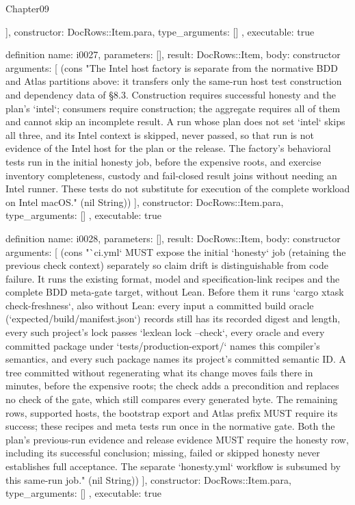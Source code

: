 \begin{lexlean}{Chapter09}
\begin{semanticmodule}
{{    ],
    constructor: DocRows::Item.para,
    type_arguments: []
  },
  executable: true
}

definition{
  name: i0027,
  parameters: [],
  result: DocRows::Item,
  body: constructor{
    arguments: [
      (cons "The Intel host factory is separate from the normative BDD and Atlas partitions above: it transfers only the same-run host test construction and dependency data of §8.3. Construction requires successful honesty and the plan's `intel`; consumers require construction; the aggregate requires all of them and cannot skip an incomplete result. A run whose plan does not set `intel` skips all three, and its Intel context is skipped, never passed, so that run is not evidence of the Intel host for the plan or the release. The factory's behavioral tests run in the initial honesty job, before the expensive roots, and exercise inventory completeness, custody and fail-closed result joins without needing an Intel runner. These tests do not substitute for execution of the complete workload on Intel macOS." (nil String))
    ],
    constructor: DocRows::Item.para,
    type_arguments: []
  },
  executable: true
}

definition{
  name: i0028,
  parameters: [],
  result: DocRows::Item,
  body: constructor{
    arguments: [
      (cons "`ci.yml` MUST expose the initial `honesty` job (retaining the previous check context) separately so claim drift is distinguishable from code failure. It runs the existing format, model and specification-link recipes and the complete BDD meta-gate target, without Lean. Before them it runs `cargo xtask check-freshness`, also without Lean: every input a committed build oracle (`expected/build/manifest.json`) records still has its recorded digest and length, every such project's lock passes `lexlean lock --check`, every oracle and every committed package under `tests/production-export/` names this compiler's semantics, and every such package names its project's committed semantic ID. A tree committed without regenerating what its change moves fails there in minutes, before the expensive roots; the check adds a precondition and replaces no check of the gate, which still compares every generated byte. The remaining rows, supported hosts, the bootstrap export and Atlas prefix MUST require its success; these recipes and meta tests run once in the normative gate. Both the plan's previous-run evidence and release evidence MUST require the honesty row, including its successful conclusion; missing, failed or skipped honesty never establishes full acceptance. The separate `honesty.yml` workflow is subsumed by this same-run job." (nil String))
    ],
    constructor: DocRows::Item.para,
    type_arguments: []
  },
  executable: true
}


\end{semanticmodule}
\end{lexlean}
